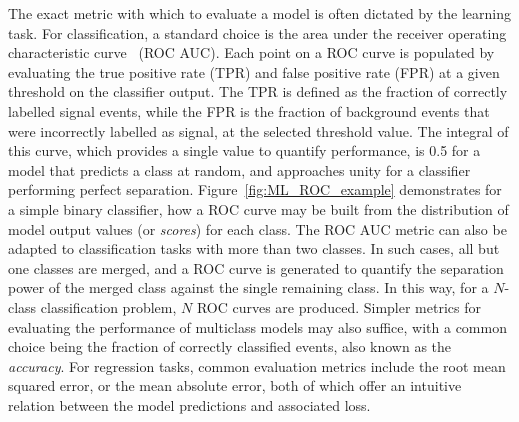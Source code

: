 The exact metric with which to evaluate a model is often dictated by the learning task. For classification, a standard choice is the area under the receiver operating characteristic curve~\cite{ROC_AUC} (ROC AUC). Each point on a ROC curve is populated by evaluating the true positive rate (TPR) and false positive rate (FPR) at a given threshold on the classifier output. The TPR is defined as the fraction of correctly labelled signal events, while the FPR is the fraction of background events that were incorrectly labelled as signal, at the selected threshold value.
The integral of this curve, which provides a single value to quantify performance, is 0.5 for a model that predicts a class at random, and approaches unity for a classifier performing perfect separation.
Figure~\ref{fig:ML_ROC_example} demonstrates for a simple binary classifier, how a ROC curve may be built from the distribution of model output values (or \textit{scores}) for each class.
The ROC AUC metric can also be adapted to classification tasks with more than two classes. In such cases, all but one classes are merged, and a ROC curve is generated to quantify the separation power of the merged class against the single remaining class. In this way, for a $N$-class classification problem, $N$ ROC curves are produced. Simpler metrics for evaluating the performance of multiclass models may also suffice, with a common choice being the fraction of correctly classified events, also known as the \emph{accuracy}.
For regression tasks, common evaluation metrics include the root mean squared error, or the mean absolute error, both of which offer an intuitive relation between the model predictions and associated loss. %

